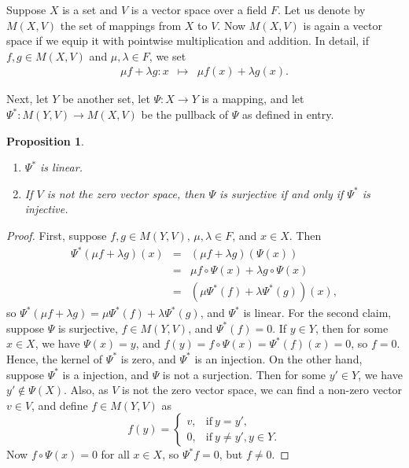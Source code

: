 \documentclass[12pt]{article}
\newtheorem{prop}{Proposition}
\begin{document}
Suppose $X$ is a set and
   $V$ is a vector space over a field $F$.
Let us denote by $M(X,V)$ the set of mappings from $X$ to $V$.
Now $M(X,V)$ is again a vector space if we equip it with 
pointwise multiplication and addition. In detail, 
if $f,g\in M(X,V)$ and $\mu,\lambda\in F$, we set
\begin{eqnarray*}
\mu f+\lambda g\colon x&\mapsto& \mu f(x) + \lambda g(x).
\end{eqnarray*}

Next, let $Y$ be another set, let $\Psi\colon X\to Y$ is a mapping,
and let $\Psi^\ast\colon M(Y,V)\to M(X,V)$ be the pullback of 
$\Psi$ as defined in  entry. 

\begin{prop} $\ $
\begin{enumerate}
\item $\Psi^\ast$ is linear. 
\item If $V$ is not the zero vector space, then 
$\Psi$ is surjective if and only if $\Psi^\ast$ is injective.
\end{enumerate}
\end{prop}

\begin{proof} First, suppose $f,g\in M(Y,V)$, $\mu,\lambda \in F$, and
$x\in X$. Then
\begin{eqnarray*}
\Psi^\ast(\mu f+\lambda g)(x) &=&(\mu f+\lambda g)(\Psi(x)) \\
   &=&\mu f\circ \Psi(x)+\lambda g\circ\Psi(x) \\
   &=&\left(\mu \Psi^\ast(f)+\lambda \Psi^\ast(g)\right)(x),
\end{eqnarray*}
so $\Psi^\ast(\mu f+\lambda g) = \mu \Psi^\ast(f)+\lambda \Psi^\ast(g)$,
and $\Psi^\ast$ is linear. 
For the second claim, suppose $\Psi$ is surjective,
    $f\in M(Y,V)$, 
   and $\Psi^\ast(f)=0$. If $y\in Y$, then for some $x\in X$, we have
$\Psi(x)=y$, and $f(y)=f\circ\Psi(x)=\Psi^\ast(f)(x)=0$, so $f=0$. 
Hence, the kernel of $\Psi^\ast$ is zero, and $\Psi^\ast$ is an 
injection. 
On the other hand, suppose $\Psi^\ast$ is a injection, and 
    $\Psi$ is not a surjection. Then for some $y'\in Y$, we have 
$y'\notin \Psi(X)$. Also, as $V$ is not the zero vector space, we can 
find a non-zero vector $v\in V$, and define $f\in M(Y,V)$ as
$$
  f(y)= \begin{cases} v, & \mbox{if}\ y=y', \\
                      0, & \mbox{if}\ y\neq y', y\in Y. \end{cases}
$$
Now $f\circ\Psi(x)=0$ for all $x\in X$, so $\Psi^\ast f=0$,
but $f\neq 0$. \end{proof}
\end{document}
